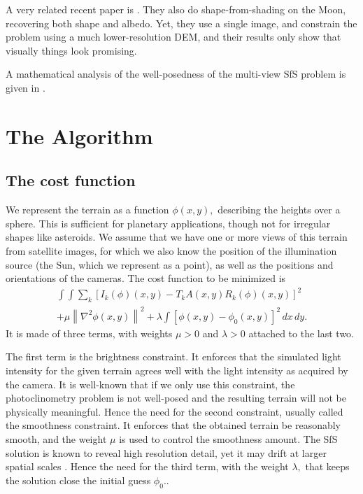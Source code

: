 \documentclass[12pt,oneside]{article}
\begin{document}
A very related recent paper is \cite{wu2016shape}. They also do
shape-from-shading on the Moon, recovering both shape and albedo. Yet,
they use a single image, and constrain the problem using a much
lower-resolution DEM, and their results only show that visually things
look promising.

A mathematical analysis of the well-posedness of the multi-view SfS
problem is given in \cite{jin20083}.

\section{The Algorithm}

\subsection{The cost function}

We represent the terrain as a function $\phi(x, y),$ describing the heights
over a sphere. This is sufficient for planetary applications,
though not for irregular shapes like asteroids. We assume that we have
one or more views of this terrain from satellite images, for which we
also know the position of the illumination source (the Sun, which we
represent as a point), as well as the positions and orientations of the
cameras. The cost function to be minimized is
\begin{multline}\label{cost}
\int\!\! \int \! \sum_k \left[ I_k(\phi)(x, y) - T_k A(x, y)
 R_k(\phi)(x, y) \right]^2\,  \\
+ \mu \left\|\nabla^2 \phi(x, y) \right\|^2  
+ \lambda \int \! \left[ \phi(x, y) - \phi_0(x, y) \right]^2
\, dx\, dy.
\end{multline}
It is made of three terms, with weights $\mu > 0$ and $\lambda > 0$
attached to the last two.

The first term is the brightness constraint. It enforces that the simulated light intensity
for the given terrain agrees well with the light intensity as acquired
by the camera. It is well-known that if we only use this constraint, the
photoclinometry problem is not well-posed \citet{horn1990height} and the
resulting terrain will not be physically meaningful. Hence the need for
the second constraint, usually called the smoothness constraint. It
enforces that the obtained terrain
be reasonably smooth, and the weight $\mu$ is used to control the
smoothness amount. The SfS solution is known to reveal high resolution
detail, yet it may drift at larger spatial scales \cite{grumpe2014construction}.
Hence the need for the third term, with the weight $\lambda,$ 
that keeps the solution close the initial guess $\phi_0.$. 
\end{document}
